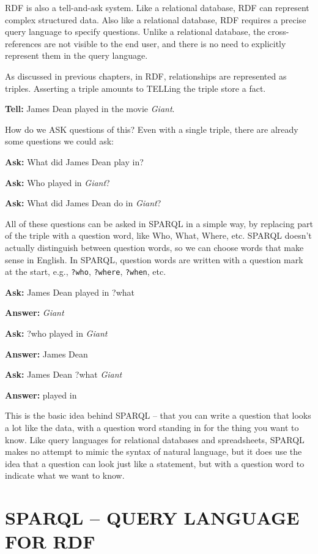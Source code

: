 RDF is also a tell-and-ask system. Like a relational database, RDF can
represent complex structured data. Also like a relational database, RDF
requires a precise query language to specify questions. Unlike a
relational database, the cross-references are not visible to the end
user, and there is no need to explicitly represent them in the query
language.

As discussed in previous chapters, in RDF, relationships are represented
as triples. Asserting a triple amounts to TELLing the triple store a
fact.

\textbf{Tell:} James Dean played in the movie \emph{Giant}.

How do we ASK questions of this? Even with a single triple, there are
already some questions we could ask:

\textbf{Ask:} What did James Dean play in?

\textbf{Ask:} Who played in \emph{Giant}?

\textbf{Ask:} What did James Dean do in \emph{Giant}?

All of these questions can be asked in SPARQL in a simple way, by
replacing part of the triple with a question word, like Who, What,
Where, etc. SPARQL doesn't actually distinguish between question words,
so we can choose words that make sense in English. In SPARQL, question
words are written with a question mark at the start, e.g., \texttt{?who}, \texttt{?where},
\texttt{?when}, etc.

\textbf{Ask:} James Dean played in ?what

\textbf{Answer:} \emph{Giant}

\textbf{Ask:} ?who played in \emph{Giant}

\textbf{Answer:} James Dean

\textbf{Ask:} James Dean ?what \emph{Giant}

\textbf{Answer:} played in

This is the basic idea behind SPARQL -- that you can write a question
that looks a lot like the data, with a question word standing in for the
thing you want to know. Like query languages for relational databases
and spreadsheets, SPARQL makes no attempt to mimic the syntax of natural
language, but it does use the idea that a question can look just like a
statement, but with a question word to indicate what we want to know.

\section{SPARQL -- QUERY LANGUAGE FOR RDF}

